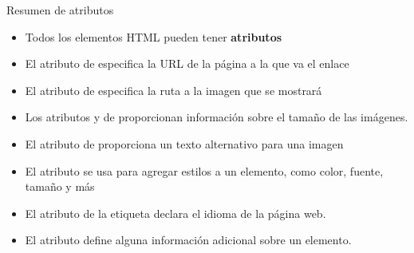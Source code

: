 \begin{frame}[c]{Resumen de atributos}
  \begin{itemize}
    \item Todos los elementos HTML pueden tener \textbf{atributos}
    \item El atributo  de  especifica la
          URL de la página a la que va el enlace
    \item El atributo  de  especifica la
          ruta a la imagen que se mostrará
    \item Los atributos  y  de 
          proporcionan información sobre el tamaño de las imágenes.
    \item El atributo  de  proporciona un
          texto alternativo para una imagen
    \item El atributo  se usa para agregar estilos a
          un elemento, como color, fuente, tamaño y más
    \item El atributo  de la etiqueta 
          declara el idioma de la página web.
    \item El atributo  define alguna información
          adicional sobre un elemento.
  \end{itemize}
\end{frame}
